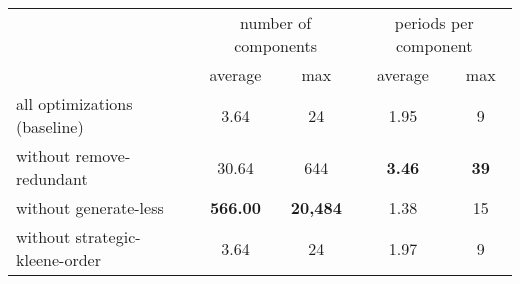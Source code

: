 \begin{table}[H]
	\centering
	\begin{tabular}{l c c c c}
		\toprule
		& \multicolumn{2}{c}{number of components} & \multicolumn{2}{c}{periods per component} \\
		\cmidrule(lr){2-3} \cmidrule(lr){4-5}
		& average & max & average & max \\
		\midrule
	all optimizations (baseline) & 3.64 & 24 & 1.95 & 9 \\
	without remove-redundant & 30.64 & 644 & \textbf{3.46} & \textbf{39} \\
	without generate-less & \textbf{566.00} & \textbf{20{,}484} & 1.38 & 15 \\
	without strategic-kleene-order & 3.64 & 24 & 1.97 & 9 \\
  \bottomrule
	\end{tabular}
\end{table}
